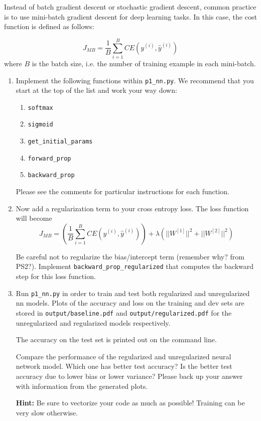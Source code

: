 Instead of batch gradient descent or stochastic gradient descent, common practice
is to use mini-batch gradient descent for deep learning tasks. In this case, the
cost function is defined as follows:

  \begin{equation*}
  J_{MB} = \frac{1}{B}\sum_{i=1}^{B}CE(y^{(i)}, \hat{y}^{(i)})
  \end{equation*}
where $B$ is the batch size, i.e. the number of training example in each mini-batch. 

\begin{enumerate}
\item {}

Implement the following functions within \texttt{p1\_nn.py}. We recommend that you start at the top of the list and work your way down:

\begin{enumerate}
\item \texttt{softmax}
\item \texttt{sigmoid}
\item \texttt{get\_initial\_params} 
\item \texttt{forward\_prop}
\item \texttt{backward\_prop}

\end{enumerate}

Please see the comments for particular instructions for each function.

\item {} Now add a regularization term to your cross entropy loss.
The loss function will become \begin{equation*}
  J_{MB} = \left(\frac{1}{B}\sum_{i=1}^{B}CE(y^{(i)}, \hat{y}^{(i)})\right) + \lambda \left(||W^{[1]}||^2 + ||W^{[2]}||^2 \right)
  \end{equation*}

Be careful not to regularize the bias/intercept term (remember why? from PS2?).
Implement \texttt{backward\_prop\_regularized} that computes the backward step for this loss function.

\item {}

Run \texttt{p1\_nn.py} in order to train and test both regularized and unregularized nn models. Plots of the accuracy and loss on the training and dev sets are stored in \texttt{output/baseline.pdf} and \texttt{output/regularized.pdf} for the unregularized and regularized models respectively.

The accuracy on the test set is printed out on the command line.

Compare the performance of the regularized and unregularized neural network model. Which one has better test accuracy? Is the better test accuracy due to lower bias or lower variance? Please back up your answer with information from the generated plots.

\textbf{Hint:} Be sure to vectorize your code as much as possible! Training can be
very slow otherwise.

\end{enumerate}



  
